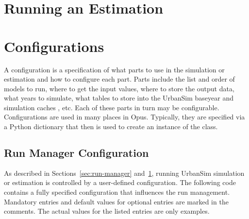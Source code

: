 \section{Running an Estimation}
\label{sec:running-estimation}


\section{Configurations}
\label{sec:configuration}
%
A configuration is a specification of what parts to use in the simulation or estimation
and how to configure each part.  Parts include the list and order of models \modelsindex to
run, where to get the input values, where to store the output data, what years
to simulate, what tables to store into the UrbanSim baseyear and simulation
caches \baseyearcacheindex\simulationcacheindex, etc. Each of these parts in
turn may be configurable. Configurations are used in many places in Opus.  Typically, they are specified
via a Python \pythonindex dictionary that then is used to create an instance of the
 class.

\subsection{Run Manager Configuration}
\label{sec:run-manager-configuration}
%

As described in Sections~\ref{sec:run-manager} and~\ref{sec:running-estimation}, 
running UrbanSim simulation or estimation is controlled by a user-defined
configuration. The following code contains a fully specified configuration
that influences the run management. \runmanagerindex Mandatory entries and default
values for optional entries are marked in the comments. The actual values for
the listed entries are only examples.

